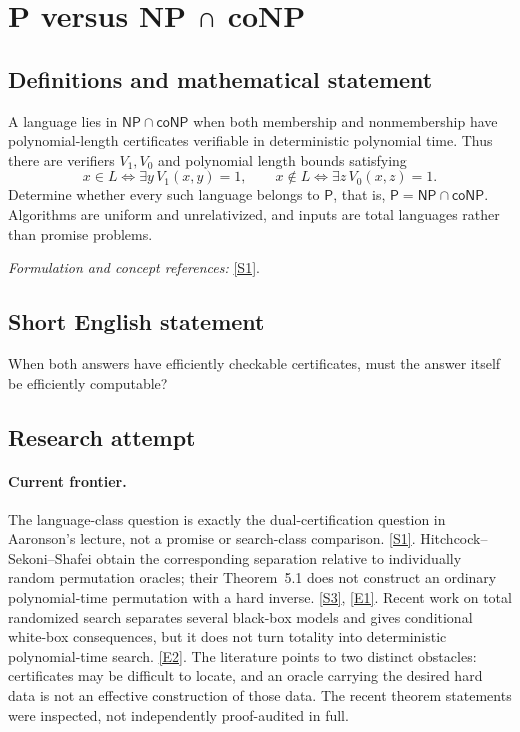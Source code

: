 \documentclass[11pt,a4paper]{article}
\newcommand{\sref}[2]{\hyperlink{source:#1:#2}{[S#2]}}
\newcommand{\eref}[2]{\hyperlink{extra:#1:#2}{[E#2]}}
\newif\ifshowcatalogue
\newcommand{\cataloguescope}[1]{\ifshowcatalogue
 \paragraph{Exact scope in the supplied catalogue.}
 \begin{quote}\small #1\end{quote}\fi}
\numberwithin{equation}{section}
\begin{document}
\setcounter{section}{0}
\clearpage
\section*{\texorpdfstring{P versus NP ∩ coNP}{P versus NP ∩ coNP}}\label{statement}
\subsection{Definitions and mathematical statement}
A language lies in $\mathsf{NP}\cap\mathsf{coNP}$ when both membership and nonmembership have polynomial-length certificates verifiable in deterministic polynomial time. Thus there are verifiers $V_1,V_0$ and polynomial length bounds satisfying
\[
 x\in L\iff\exists y\,V_1(x,y)=1,\qquad
 x\notin L\iff\exists z\,V_0(x,z)=1.
\]
Determine whether every such language belongs to $\mathsf P$, that is, $\mathsf P=\mathsf{NP}\cap\mathsf{coNP}$. Algorithms are uniform and unrelativized, and inputs are total languages rather than promise problems.
\par\smallskip\textit{Formulation and concept references:} \sref{statement}{1}.
\cataloguescope{Determine whether P = NP \ensuremath{\cap} coNP for ordinary uniform deterministic and nondeterministic polynomial-time Turing-machine classes of total languages over a finite alphabet; equivalently, whether every language with polynomially checkable certificates for both membership and nonmembership has a deterministic polynomial-time decision algorithm.}
\subsection{Short English statement}
When both answers have efficiently checkable certificates, must the answer itself be efficiently computable?
\subsection{Research attempt}

\paragraph{Current frontier.}
The language-class question is exactly the dual-certification question in
Aaronson's lecture, not a promise or search-class comparison.
\sref{statement}{1}. Hitchcock--Sekoni--Shafei obtain the corresponding separation
relative to individually random permutation oracles; their Theorem~5.1 does
not construct an ordinary polynomial-time permutation with a hard inverse.
\sref{statement}{3}, \eref{statement}{1}. Recent work on total randomized search separates
several black-box models and gives conditional white-box consequences, but
it does not turn totality into deterministic polynomial-time search.
\eref{statement}{2}. The literature points to two distinct obstacles: certificates
may be difficult to locate, and an oracle carrying the desired hard data is
not an effective construction of those data. The recent theorem statements
were inspected, not independently proof-audited in full.
\end{document}
